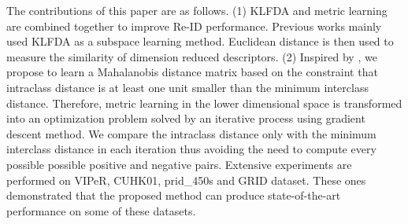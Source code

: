 \documentclass[10pt,twocolumn,letterpaper]{article}
\begin{document}
\indent The contributions of this paper are as follows. (1) KLFDA and metric learning are combined together to improve Re-ID performance. Previous works mainly used KLFDA  \cite{KernelVersionMetrics} as a subspace learning method. Euclidean distance is then used to measure the similarity of dimension reduced descriptors. (2) Inspired by \cite{TDL}, we propose to learn a Mahalanobis distance matrix based on the constraint that intraclass distance is at least one unit smaller than the minimum interclass distance. Therefore, metric learning in the lower dimensional space is transformed into an optimization problem solved by an iterative process using gradient descent method. We compare the intraclass distance only with the minimum interclass distance in each iteration thus avoiding the need to compute every possible possible positive and negative pairs. Extensive experiments are performed on VIPeR, CUHK01, prid\_450s and GRID dataset. These ones demonstrated that the proposed method can produce state-of-the-art performance on some of these datasets.

\end{document}
